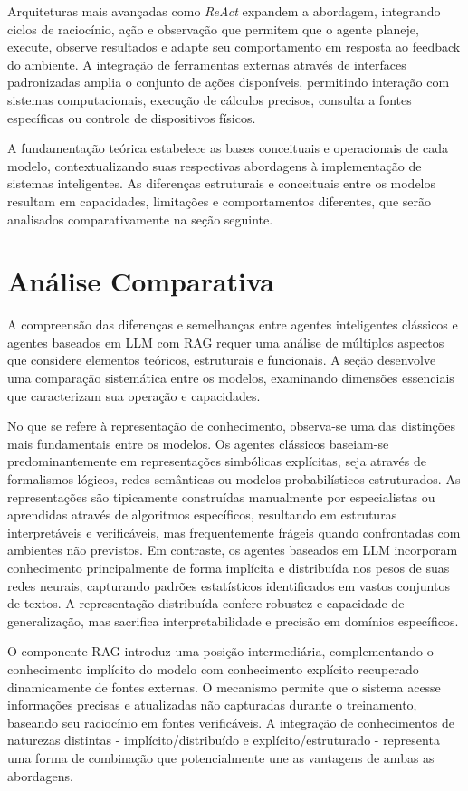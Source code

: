 \documentclass[12pt]{article}
\begin{document}
Arquiteturas mais avançadas como \textit{ReAct} \citep{yao2022react} expandem a abordagem, integrando ciclos de raciocínio, ação e observação que permitem que o agente planeje, execute, observe resultados e adapte seu comportamento em resposta ao feedback do ambiente. A integração de ferramentas externas através de interfaces padronizadas amplia o conjunto de ações disponíveis, permitindo interação com sistemas computacionais, execução de cálculos precisos, consulta a fontes específicas ou controle de dispositivos físicos.

A fundamentação teórica estabelece as bases conceituais e operacionais de cada modelo, contextualizando suas respectivas abordagens à implementação de sistemas inteligentes. As diferenças estruturais e conceituais entre os modelos resultam em capacidades, limitações e comportamentos diferentes, que serão analisados comparativamente na seção seguinte.

\section{Análise Comparativa}

A compreensão das diferenças e semelhanças entre agentes inteligentes clássicos e agentes baseados em LLM com RAG requer uma análise de múltiplos aspectos que considere elementos teóricos, estruturais e funcionais. A seção desenvolve uma comparação sistemática entre os modelos, examinando dimensões essenciais que caracterizam sua operação e capacidades.

No que se refere à representação de conhecimento, observa-se uma das distinções mais fundamentais entre os modelos. Os agentes clássicos baseiam-se predominantemente em representações simbólicas explícitas, seja através de formalismos lógicos, redes semânticas ou modelos probabilísticos estruturados. As representações são tipicamente construídas manualmente por especialistas ou aprendidas através de algoritmos específicos, resultando em estruturas interpretáveis e verificáveis, mas frequentemente frágeis quando confrontadas com ambientes não previstos. Em contraste, os agentes baseados em LLM incorporam conhecimento principalmente de forma implícita e distribuída nos pesos de suas redes neurais, capturando padrões estatísticos identificados em vastos conjuntos de textos. A representação distribuída confere robustez e capacidade de generalização, mas sacrifica interpretabilidade e precisão em domínios específicos.

O componente RAG introduz uma posição intermediária, complementando o conhecimento implícito do modelo com conhecimento explícito recuperado dinamicamente de fontes externas. O mecanismo permite que o sistema acesse informações precisas e atualizadas não capturadas durante o treinamento, baseando seu raciocínio em fontes verificáveis. A integração de conhecimentos de naturezas distintas - implícito/distribuído e explícito/estruturado - representa uma forma de combinação que potencialmente une as vantagens de ambas as abordagens.
\end{document}
